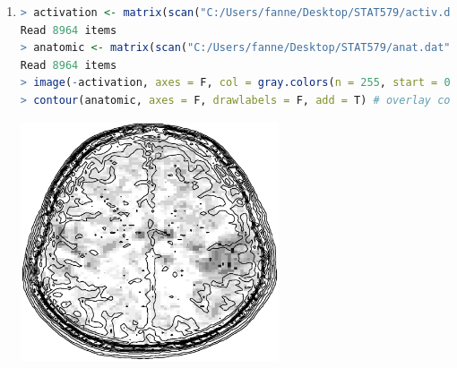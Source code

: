 \documentclass{article}
\begin{document}
\begin{enumerate}[leftmargin = 0 em, label = \arabic*., font = \bfseries]
\begin{enumerate}
\item
\begin{lstlisting}[language = R]
> pdf(file = "C:/Users/fanne/Desktop/STAT579/speed-vs-distance.pdf", onefile = T) # print to one file
> plot(x = cars$dist, y = speed_ft_per_s, xlab = "Distance (feet)", ylab = "Speed (feet/second)", main = "Speed (feet/second) vs. Distance (feet)") # plot speed (feet/second) against distance (feet)
> plot(x = dist_m, y = speed_m_per_s, xlab = "Distance (meter)", ylab = "Speed (meter/second)", main = "Speed (meter/second) vs. Distance (meter)") # plot speed (meter/second) against distance (meter)
> dev.off()
\end{lstlisting}

Except for the measurement, they look the same.
\end{enumerate}

\item
\begin{lstlisting}[language = R]
> activation <- matrix(scan("C:/Users/fanne/Desktop/STAT579/activ.dat"), nrow = 83, ncol = 108, byrow = T) # read activation data
Read 8964 items
> anatomic <- matrix(scan("C:/Users/fanne/Desktop/STAT579/anat.dat"), nrow = 83, ncol = 108, byrow = T) # read anatomic data
Read 8964 items
> image(-activation, axes = F, col = gray.colors(n = 255, start = 0.1, end = 1)) # plot the image of activation
> contour(anatomic, axes = F, drawlabels = F, add = T) # overlay contour of anatomic atop activation image
\end{lstlisting}

\begin{center}
\includegraphics[width = 0.6\textwidth]{brain.eps}
\end{center}
\end{enumerate}
	
	
	
\end{document}
